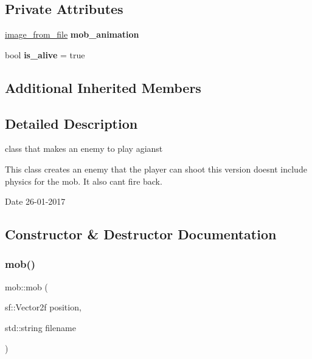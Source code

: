 \subsection*{Private Attributes}
\begin{DoxyCompactItemize}
\item 
\mbox{\label{classmob_a28d29e0a52a7094c995df09dcdcf0d3e}} 
\hyperlink{classimage__from__file}{image\+\_\+from\+\_\+file} {\bfseries mob\+\_\+animation}
\item 
\mbox{\label{classmob_a395256ca1ea387e4a8867d399e1b0b0b}} 
bool {\bfseries is\+\_\+alive} = true
\end{DoxyCompactItemize}
\subsection*{Additional Inherited Members}


\subsection{Detailed Description}
class that makes an enemy to play agianst 

This class creates an enemy that the player can shoot this version doesn\textquotesingle{}t include physics for the mob. It also can\textquotesingle{}t fire back.

\begin{DoxyDate}{Date}
26-\/01-\/2017 
\end{DoxyDate}


\subsection{Constructor \& Destructor Documentation}
\mbox{\label{classmob_ac524dd40986df00721239b66c552437e}} 
\subsubsection{\texorpdfstring{mob()}{mob()}}
{\footnotesize\ttfamily mob\+::mob (\begin{DoxyParamCaption}\item[{sf\+::\+Vector2f}]{position,  }\item[{std\+::string}]{filename }\end{DoxyParamCaption})}



